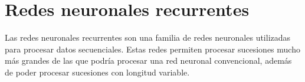 
\section{Redes neuronales recurrentes}
Las redes neuronales recurrentes son una familia de redes neuronales utilizadas para procesar datos secuenciales. Estas redes permiten procesar sucesiones mucho más grandes de las que podría procesar una red neuronal convencional, además de poder procesar sucesiones con longitud variable.
\cite{goodfellow-et-al-2016}
\cite{Rumelhart:1986:LIR:104279.104293}

\vspace{1em}

